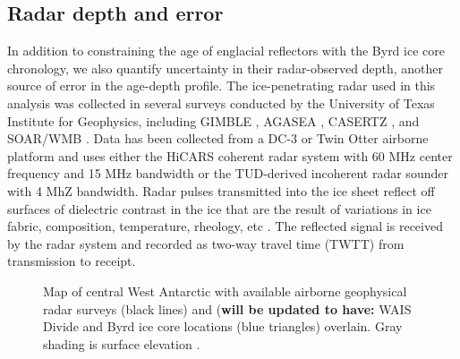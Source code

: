 \subsection{Radar depth and error}
In addition to constraining the age of englacial reflectors with the Byrd ice core chronology, we also quantify uncertainty in their radar-observed depth, another source of error in the age-depth profile. The ice-penetrating radar used in this analysis was collected in several surveys conducted by the University of Texas Institute for Geophysics, including GIMBLE \citep{wais2016}, AGASEA \citep{holt2006}, CASERTZ \citep{morse2002}, and SOAR/WMB \citep{luyendyk2003}. Data has been collected from a DC-3 or Twin Otter airborne platform and uses either the HiCARS coherent radar system with 60 MHz center frequency and 15 MHz bandwidth \citep{peters2005} or the TUD-derived incoherent radar sounder \citep{blankenship2001} with 4 MhZ bandwidth. Radar pulses transmitted into the ice sheet reflect off surfaces of dielectric contrast in the ice that are the result of variations in ice fabric, composition, temperature, rheology, etc \citep{fujita2000}. The reflected signal is received by the radar system and recorded as two-way travel time (TWTT) from transmission to receipt. 


\begin{figure}[h]\label{fig:radarmap}
\centering
{}
\caption{Map of central West Antarctic with available airborne geophysical radar surveys (black lines) and (\textbf{will be updated to have:} WAIS Divide and Byrd ice core locations (blue triangles) overlain. Gray shading is surface elevation \citep{fretwell2013}. }

\end{figure}



